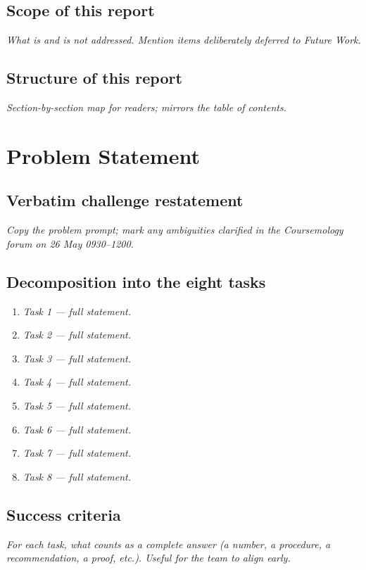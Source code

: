 \documentclass[12pt,a4paper]{article}
\newcommand{\ph}[1]{\textit{\textcolor{phgray}{#1}}}
\begin{document}
\subsection{Scope of this report}
\ph{What is and is not addressed. Mention items deliberately deferred to Future Work.}

\subsection{Structure of this report}
\ph{Section-by-section map for readers; mirrors the table of contents.}

\section{Problem Statement}
\subsection{Verbatim challenge restatement}
\ph{Copy the problem prompt; mark any ambiguities clarified in the Coursemology forum on 26 May 0930–1200.}

\subsection{Decomposition into the eight tasks}
\begin{enumerate}[leftmargin=*, label=\textbf{T\arabic*.}]
\item \ph{Task 1 — full statement.}
\item \ph{Task 2 — full statement.}
\item \ph{Task 3 — full statement.}
\item \ph{Task 4 — full statement.}
\item \ph{Task 5 — full statement.}
\item \ph{Task 6 — full statement.}
\item \ph{Task 7 — full statement.}
\item \ph{Task 8 — full statement.}
\end{enumerate}

\subsection{Success criteria}
\ph{For each task, what counts as a complete answer (a number, a procedure, a recommendation, a proof, etc.). Useful for the team to align early.}
\end{document}
